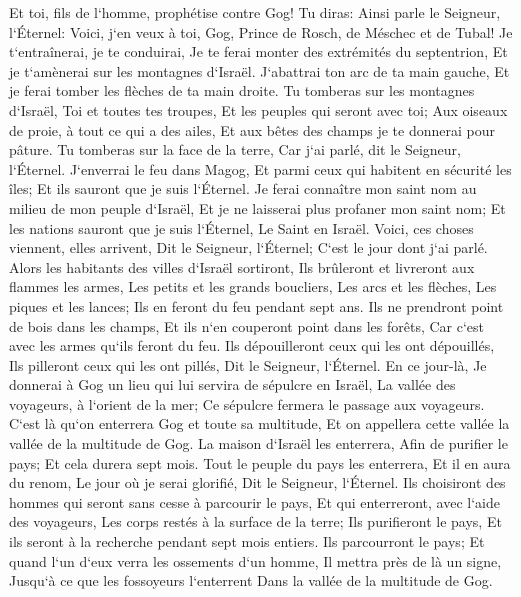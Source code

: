 \verse Et toi, fils de l`homme, prophétise contre Gog! Tu diras: Ainsi parle le Seigneur, l`Éternel: Voici, j`en veux à toi, Gog, Prince de Rosch, de Méschec et de Tubal! 
\verse Je t`entraînerai, je te conduirai, Je te ferai monter des extrémités du septentrion, Et je t`amènerai sur les montagnes d`Israël. 
\verse J`abattrai ton arc de ta main gauche, Et je ferai tomber les flèches de ta main droite. 
\verse Tu tomberas sur les montagnes d`Israël, Toi et toutes tes troupes, Et les peuples qui seront avec toi; Aux oiseaux de proie, à tout ce qui a des ailes, Et aux bêtes des champs je te donnerai pour pâture. 
\verse Tu tomberas sur la face de la terre, Car j`ai parlé, dit le Seigneur, l`Éternel. 
\verse J`enverrai le feu dans Magog, Et parmi ceux qui habitent en sécurité les îles; Et ils sauront que je suis l`Éternel. 
\verse Je ferai connaître mon saint nom au milieu de mon peuple d`Israël, Et je ne laisserai plus profaner mon saint nom; Et les nations sauront que je suis l`Éternel, Le Saint en Israël. 
\verse Voici, ces choses viennent, elles arrivent, Dit le Seigneur, l`Éternel; C`est le jour dont j`ai parlé. 
\verse Alors les habitants des villes d`Israël sortiront, Ils brûleront et livreront aux flammes les armes, Les petits et les grands boucliers, Les arcs et les flèches, Les piques et les lances; Ils en feront du feu pendant sept ans. 
\verse Ils ne prendront point de bois dans les champs, Et ils n`en couperont point dans les forêts, Car c`est avec les armes qu`ils feront du feu. Ils dépouilleront ceux qui les ont dépouillés, Ils pilleront ceux qui les ont pillés, Dit le Seigneur, l`Éternel. 
\verse En ce jour-là, Je donnerai à Gog un lieu qui lui servira de sépulcre en Israël, La vallée des voyageurs, à l`orient de la mer; Ce sépulcre fermera le passage aux voyageurs. C`est là qu`on enterrera Gog et toute sa multitude, Et on appellera cette vallée la vallée de la multitude de Gog. 
\verse La maison d`Israël les enterrera, Afin de purifier le pays; Et cela durera sept mois. 
\verse Tout le peuple du pays les enterrera, Et il en aura du renom, Le jour où je serai glorifié, Dit le Seigneur, l`Éternel. 
\verse Ils choisiront des hommes qui seront sans cesse à parcourir le pays, Et qui enterreront, avec l`aide des voyageurs, Les corps restés à la surface de la terre; Ils purifieront le pays, Et ils seront à la recherche pendant sept mois entiers. 
\verse Ils parcourront le pays; Et quand l`un d`eux verra les ossements d`un homme, Il mettra près de là un signe, Jusqu`à ce que les fossoyeurs l`enterrent Dans la vallée de la multitude de Gog. 

